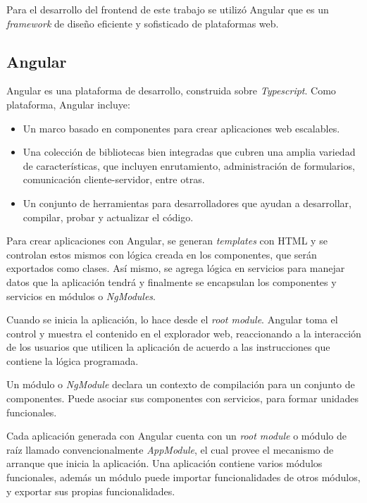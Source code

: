 Para el desarrollo del frontend de este trabajo se utilizó Angular\citep{WEBSITE:29} que es un \textit{framework} de diseño eficiente y sofisticado de plataformas web. 

\subsection{Angular}

Angular es una plataforma de desarrollo, construida sobre \textit{Typescript}\citep{WEBSITE:30}. Como plataforma, Angular incluye:

\begin{itemize}
	\item Un marco basado en componentes para crear aplicaciones web escalables.
	
	\item Una colección de bibliotecas bien integradas que cubren una amplia variedad de características, que incluyen enrutamiento, administración de formularios, comunicación cliente-servidor, entre otras.
	
	\item Un conjunto de herramientas para desarrolladores que ayudan a desarrollar, compilar, probar y actualizar el código.
	
\end{itemize}

Para crear aplicaciones con Angular, se generan \textit{templates} con HTML y se controlan estos mismos con lógica creada en los componentes, que serán exportados como clases. Así mismo, se agrega lógica en servicios para manejar datos que la aplicación tendrá y finalmente se encapsulan los componentes y servicios en módulos o \textit{NgModules}.

Cuando se inicia la aplicación, lo hace desde el \textit{root module}. Angular toma el control y muestra el contenido en el explorador web, reaccionando a la interacción de los usuarios que utilicen la aplicación de acuerdo a las instrucciones que contiene la lógica programada.

Un módulo o \textit{NgModule} declara un contexto de compilación para un conjunto de componentes. Puede asociar sus componentes con servicios, para formar unidades funcionales. 

Cada aplicación generada con Angular cuenta con un \textit{root module} o módulo de raíz llamado convencionalmente \textit{AppModule}, el cual provee el mecanismo de arranque que inicia la aplicación. Una aplicación contiene varios módulos funcionales, además un módulo puede importar funcionalidades de otros módulos, y exportar sus propias funcionalidades. 

